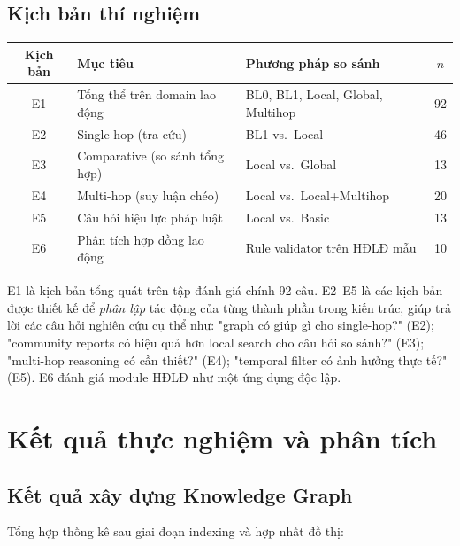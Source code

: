 \documentclass[../DoAn.tex]{subfiles}
\begin{document}
\subsection{Kịch bản thí nghiệm}
\label{subsection:4.3.2}

\begin{center}
\label{table:experiments}
\small
\begin{tabular}{|c|p{5.2cm}|p{6cm}|c|}
\hline
\textbf{Kịch bản} & \textbf{Mục tiêu} & \textbf{Phương pháp so sánh} & \textbf{$n$} \\
\hline
E1 & Tổng thể trên domain lao động & BL0, BL1, Local, Global, Multihop & 92 \\
E2 & Single-hop (tra cứu) & BL1 vs.\ Local & 46 \\
E3 & Comparative (so sánh tổng hợp) & Local vs.\ Global & 13 \\
E4 & Multi-hop (suy luận chéo) & Local vs.\ Local+Multihop & 20 \\
E5 & Câu hỏi hiệu lực pháp luật & Local vs.\ Basic & 13 \\
E6 & Phân tích hợp đồng lao động & Rule validator trên HĐLĐ mẫu & 10 \\
\hline
\end{tabular}
\end{center}

E1 là kịch bản tổng quát trên tập đánh giá chính 92 câu. E2--E5 là các kịch bản được thiết kế để \emph{phân lập} tác động của từng thành phần trong kiến trúc, giúp trả lời các câu hỏi nghiên cứu cụ thể như: "graph có giúp gì cho single-hop?" (E2); "community reports có hiệu quả hơn local search cho câu hỏi so sánh?" (E3); "multi-hop reasoning có cần thiết?" (E4); "temporal filter có ảnh hưởng thực tế?" (E5). E6 đánh giá module HĐLĐ như một ứng dụng độc lập.

\section{Kết quả thực nghiệm và phân tích}
\label{section:4.4}

\subsection{Kết quả xây dựng Knowledge Graph}
\label{subsection:4.4.1}

Tổng hợp thống kê sau giai đoạn indexing và hợp nhất đồ thị:
\end{document}
